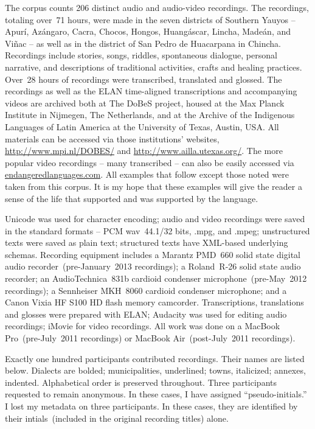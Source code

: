 The corpus counts 206 distinct audio and audio-video recordings. The recordings, totaling over~71 hours, were made in the seven districts of Southern Yauyos -- Apur\'i, Az\'angaro, Cacra, Chocos, Hongos, Hu\-ang\'ascar, Lincha, Made\'an, and Vi\~nac -- as well as in the district of San Pedro de Huacarpana in Chincha. Recordings include stories, songs, riddles, spontaneous dialogue, personal narrative, and descriptions of traditional activities, crafts and healing practices. Over~28 hours of recordings were transcribed, translated and glossed. The recordings as well as the ELAN time-aligned transcriptions and accompanying videos are archived both at The DoBeS project, housed at the Max Planck Institute in Nijmegen, The Netherlands, and at the Archive of the Indigenous Languages of Latin America at the University of Texas, Austin, USA. All materials can be accessed via those institutions' websites, \url{http://www.mpi.nl/DOBES/} and \url{http://www.ailla.utexas.org/}. The more popular video recordings -- many transcribed -- can also be easily accessed via \url{endangeredlanguages.com}. All examples that follow except those noted \dag{} were taken from this corpus. It is my hope that these examples will give the reader a sense of the life that supported and was supported by the language. 

Unicode was used for character encoding; audio and video recordings were saved in the standard formats -- PCM \textrm{wav}~44.1/32 bits, \textrm{.mpg}, and \textrm{.mpeg}; unstructured texts were saved as plain text; structured texts have XML-based underlying schemas. Recording equipment includes a Marantz PMD~660 solid state digital audio recorder~(pre-January~2013 recordings); a Roland~R-26 solid state audio recorder; an AudioTechnica~831b cardioid condenser microphone~(pre-May~2012 recordings); a Sennheiser MKH~8060 cardioid condenser microphone; and a Canon Vixia HF S100 HD flash memory camcorder. Transcriptions, translations and glosses were prepared with ELAN; Audacity was used for editing audio recordings; iMovie for video recordings. All work was done on a MacBook Pro~(pre-July~2011 recordings) or MacBook Air~(post-July~2011 recordings). 

Exactly one hundred participants contributed recordings. Their names are listed below. Dialects are bolded; municipalities, underlined; towns, italicized; annexes, indented. Alphabetical order is preserved throughout. Three participants requested to remain anonymous. In these cases, I have assigned ``pseudo-initials.'' I lost my metadata on three participants. In these cases, they are identified by their intials~(included in the original recording titles) alone.\\

